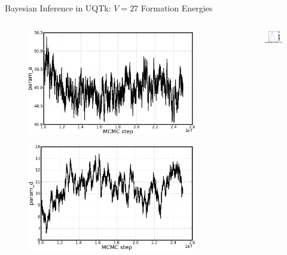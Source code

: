 \documentclass[10pt]{beamer}
\begin{document}
\begin{frame}{Bayesian Inference in UQTk: $V = 27$ Formation Energies}
  	\begin{columns}[onlytextwith]
    	\begin{column}{0.5\textwidth}
      		\begin{figure}
        		\includegraphics[width=0.95\textwidth]{prob5_chn_param_a}
      		\end{figure}
      		\begin{figure}
        		\includegraphics[width=0.95\textwidth]{prob5_chn_param_d}
      		\end{figure}
    	\end{column}  
    	\begin{column}{0.5\textwidth}
      		\begin{figure}
        		\includegraphics[height=0.2\textheight]{posterior_a}

\end{figure}
\end{column}
\end{columns}
\end{frame}
\end{document}
